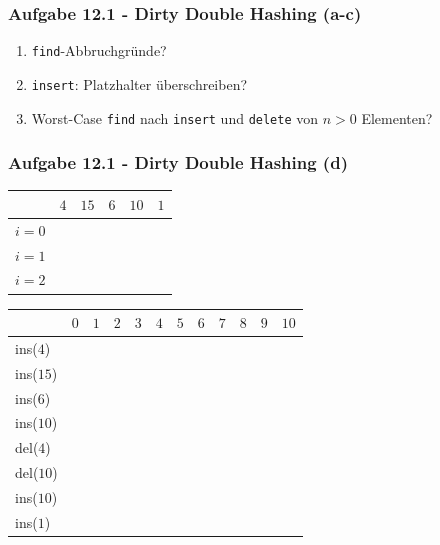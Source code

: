 \documentclass{beamer}
\begin{document}
\begin{frame}[t]
	\frametitle{Aufgabe 12.1 - Dirty Double Hashing (a-c)}
	\small
	\begin{enumerate}[label=\textcolor{black}{\alph*)},align=left,leftmargin=*,itemsep=5em]
		\item \lstinline{find}-Abbruchgründe?
		\item \lstinline{insert}: Platzhalter überschreiben?
		\item Worst-Case \lstinline{find} nach \lstinline{insert} und \lstinline{delete} von $n > 0$ Elementen?
	\end{enumerate}
\end{frame}

\begin{frame}
	\frametitle{Aufgabe 12.1 - Dirty Double Hashing (d)}
	\begin{table}
		\centering
		\small
		\begin{tabular}{c|c|c|c|c|c|}
			      & $4$ & $15$ & $6$ & $10$ & $1$ \\
			\hline
			$i=0$ &     &      &     &      &     \\
			\hline
			$i=1$ &     &      &     &      &     \\
			\hline
			$i=2$ &     &      &     &      &
		\end{tabular}
	\end{table}

	\begin{table}
		\centering
		\small
		\begin{tabular}{l|c|c|c|c|c|c|c|c|c|c|c}
			          & $0$ & $1$ & $2$ & $3$ & $4$ & $5$ & $6$ & $7$ & $8$ & $9$ & $10$ \\
			\hline
			ins($4$)  &     &     &     &     &     &     &     &     &     &     &      \\
			\hline
			ins($15$) &     &     &     &     &     &     &     &     &     &     &      \\
			\hline
			ins($6$)  &     &     &     &     &     &     &     &     &     &     &      \\
			\hline
			ins($10$) &     &     &     &     &     &     &     &     &     &     &      \\
			\hline
			del($4$)  &     &     &     &     &     &     &     &     &     &     &      \\
			\hline
			del($10$) &     &     &     &     &     &     &     &     &     &     &      \\
			\hline
			ins($10$) &     &     &     &     &     &     &     &     &     &     &      \\
			\hline
			ins($1$)  &     &     &     &     &     &     &     &     &     &     &      \\
			\hline
		\end{tabular}
	\end{table}
\end{frame}
\end{document}
